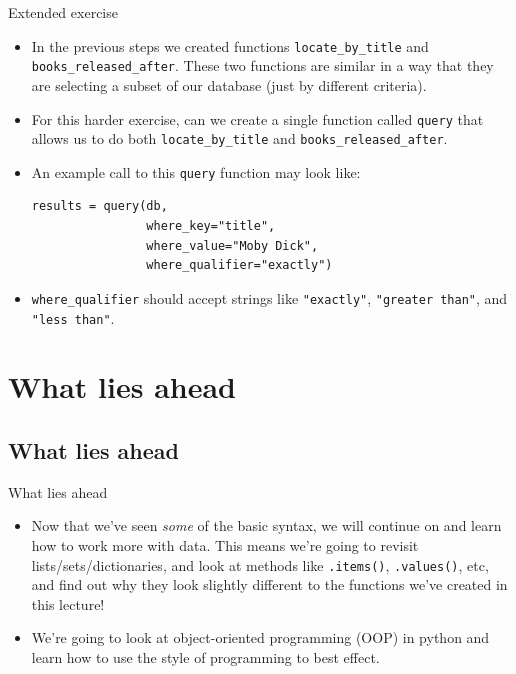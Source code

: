\documentclass[10pt]{beamer}
\begin{document}
\begin{frame}[label={sec:org60b4bfe},fragile]{Extended exercise}
 \begin{itemize}
\item In the previous steps we created functions \texttt{locate\_by\_title} and
\texttt{books\_released\_after}. These two functions are similar in a way that they are
selecting a subset of our database (just by different criteria).
\item For this harder exercise, can we create a single function called \texttt{query} that allows
us to do both \texttt{locate\_by\_title} and \texttt{books\_released\_after}.
\item An example call to this \texttt{query} function may look like:

\begin{verbatim}
results = query(db,
                where_key="title",
                where_value="Moby Dick",
                where_qualifier="exactly")
\end{verbatim}

\item \texttt{where\_qualifier} should accept strings like \texttt{"exactly"}, \texttt{"greater than"}, and \texttt{"less
  than"}.
\end{itemize}
\end{frame}

\section{What lies ahead}
\label{sec:org505c2c5}

\subsection{What lies ahead}
\label{sec:org14c72f5}

\begin{frame}[label={sec:orgde88e55},fragile]{What lies ahead}
 \begin{itemize}
\item Now that we've seen \emph{some} of the basic syntax, we will continue on and learn how to
work more with data. This means we're going to revisit lists/sets/dictionaries, and
look at methods like \texttt{.items()}, \texttt{.values()}, etc, and find out why they look slightly
different to the functions we've created in this lecture!
\item We're going to look at object-oriented programming (OOP) in python and learn how to
use the style of programming to best effect.
\end{itemize}
\end{frame}
\end{document}
